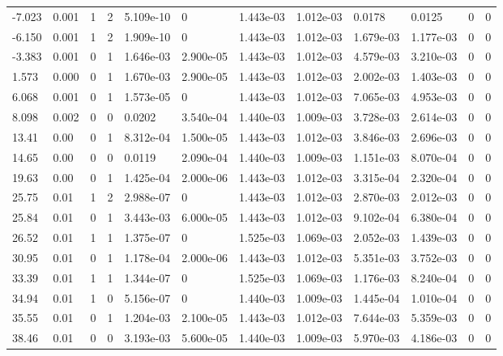 \documentclass[preview]{standalone}
\begin{document}
{{\begin{tabular}{L{1.2cm}C{1.2cm} C{0.3cm}C{0.5cm} C{1.4cm}C{1.4cm} C{1.4cm}C{1.4cm} C{1.6cm}C{1.6cm} C{1.6cm}C{1.6cm}}
  -7.023  &  0.001  & 1     &  2 &  5.109e-10  & 0  &  1.443e-03&   1.012e-03& 0.0178 & 0.0125   &  0 & 0  \\ 
  -6.150  &  0.001  & 1     &  2 &  1.909e-10  & 0  &  1.443e-03&   1.012e-03& 1.679e-03 & 1.177e-03   &  0 & 0  \\ 
  -3.383  &  0.001  & 0     &  1 &  1.646e-03  & 2.900e-05  &  1.443e-03&   1.012e-03& 4.579e-03 & 3.210e-03   &  0 & 0  \\ 
  1.573  &  0.000  & 0     &  1 &  1.670e-03  & 2.900e-05  &  1.443e-03&   1.012e-03& 2.002e-03 & 1.403e-03   &  0 & 0  \\ 
  6.068  &  0.001  & 0     &  1 &  1.573e-05  & 0  &  1.443e-03&   1.012e-03& 7.065e-03 & 4.953e-03   &  0 & 0  \\ 
  8.098  &  0.002  & 0     &  0 &  0.0202  & 3.540e-04  &  1.440e-03&   1.009e-03& 3.728e-03 & 2.614e-03   &  0 & 0  \\ 
  13.41  &  0.00  & 0     &  1 &  8.312e-04  & 1.500e-05  &  1.443e-03&   1.012e-03& 3.846e-03 & 2.696e-03   &  0 & 0  \\ 
  14.65  &  0.00  & 0     &  0 &  0.0119  & 2.090e-04  &  1.440e-03&   1.009e-03& 1.151e-03 & 8.070e-04   &  0 & 0  \\ 
  19.63  &  0.00  & 0     &  1 &  1.425e-04  & 2.000e-06  &  1.443e-03&   1.012e-03& 3.315e-04 & 2.320e-04   &  0 & 0  \\ 
  25.75  &  0.01  & 1     &  2 &  2.988e-07  & 0  &  1.443e-03&   1.012e-03& 2.870e-03 & 2.012e-03   &  0 & 0  \\ 
  25.84  &  0.01  & 0     &  1 &  3.443e-03  & 6.000e-05  &  1.443e-03&   1.012e-03& 9.102e-04 & 6.380e-04   &  0 & 0  \\ 
  26.52  &  0.01  & 1     &  1 &  1.375e-07  & 0  &  1.525e-03&   1.069e-03& 2.052e-03 & 1.439e-03   &  0 & 0  \\ 
  30.95  &  0.01  & 0     &  1 &  1.178e-04  & 2.000e-06  &  1.443e-03&   1.012e-03& 5.351e-03 & 3.752e-03   &  0 & 0  \\ 
  33.39  &  0.01  & 1     &  1 &  1.344e-07  & 0  &  1.525e-03&   1.069e-03& 1.176e-03 & 8.240e-04   &  0 & 0  \\ 
  34.94  &  0.01  & 1     &  0 &  5.156e-07  & 0  &  1.440e-03&   1.009e-03& 1.445e-04 & 1.010e-04   &  0 & 0  \\ 
  35.55  &  0.01  & 0     &  1 &  1.204e-03  & 2.100e-05  &  1.443e-03&   1.012e-03& 7.644e-03 & 5.359e-03   &  0 & 0  \\ 
  38.46  &  0.01  & 0     &  0 &  3.193e-03  & 5.600e-05  &  1.440e-03&   1.009e-03& 5.970e-03 & 4.186e-03   &  0 & 0  \\ 

\end{tabular}}}
\end{document}
